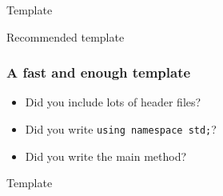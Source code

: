 \documentclass{beamer}
\newcommand{\source}[1]{
	
}
\begin{document}
\begin{section}{Template}
\begin{subsection}{Recommended template}
\begin{frame}[fragile]
	\frametitle{A fast and enough template}
	\begin{itemize}
		\item Did you include lots of header files?
		\item Did you write \texttt{using namespace std;}?
		\item Did you write the main method?
	\end{itemize}
	\pause
	\begin{block}{Template}
		\source{./src/template.cpp}
	\end{block}
\end{frame}
\end{subsection}
\end{section}
\end{document}
